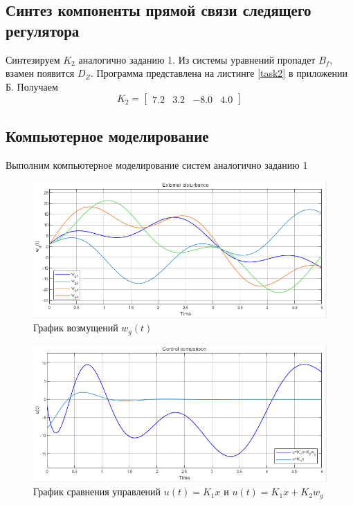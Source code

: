 \documentclass[a4paper, 12pt]{article}
\begin{document}
    \subsection{Синтез компоненты прямой связи следящего регулятора}
    Синтезируем $K_2$ аналогично заданию 1. Из системы уравнений пропадет $B_f$, взамен появится $D_Z$.
    Программа представлена на листинге \ref{task2} в приложении Б. Получаем
    $$
    K_2=\begin{bmatrix}
        7.2    &3.2  &-8.0  &4.0
    \end{bmatrix}
    $$


    \subsection{Компьютерное моделирование}
    Выполним компьютерное моделирование систем аналогично заданию 1
    \begin{figure}[H]
        \centering
        \includegraphics[scale=0.75]{2task_wg.png}
        \captionsetup{skip=0pt}
        \caption{График возмущений $ w_g(t)$}
        \label{fig:2task_wg}
    \end{figure}
    \begin{figure}[H]
        \centering
        \includegraphics[scale=0.75]{2task_uu.png}
        \captionsetup{skip=0pt}
        \caption{График сравнения управлений $u(t)=K_1x$ и $u(t)=K_1x+K_2 w_g$}
        \label{fig:2task_uu}
    \end{figure}
\end{document}
